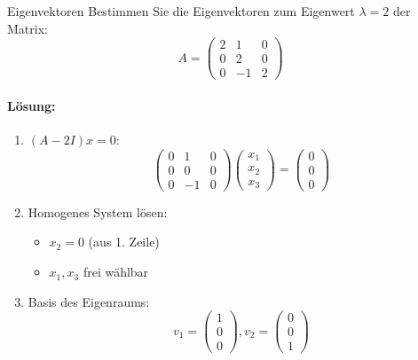 \begin{example2}{Eigenvektoren}
Bestimmen Sie die Eigenvektoren zum Eigenwert $\lambda=2$ der Matrix:
$$A = \begin{pmatrix}
2 & 1 & 0 \\
0 & 2 & 0 \\
0 & -1 & 2
\end{pmatrix}$$

\paragraph{Lösung:}
\begin{enumerate}
    \item $(A-2I)x = 0$:
    $$\begin{pmatrix}
    0 & 1 & 0 \\
    0 & 0 & 0 \\
    0 & -1 & 0
    \end{pmatrix} \begin{pmatrix}
    x_1 \\ x_2 \\ x_3
    \end{pmatrix} = \begin{pmatrix}
    0 \\ 0 \\ 0
    \end{pmatrix}$$
    
    \item Homogenes System lösen:
    \begin{itemize}
        \item $x_2 = 0$ (aus 1. Zeile)
        \item $x_1, x_3$ frei wählbar
    \end{itemize}
    
    \item Basis des Eigenraums:
    $$v_1 = \begin{pmatrix} 1 \\ 0 \\ 0 \end{pmatrix}, 
    v_2 = \begin{pmatrix} 0 \\ 0 \\ 1 \end{pmatrix}$$
\end{enumerate}
\end{example2}


